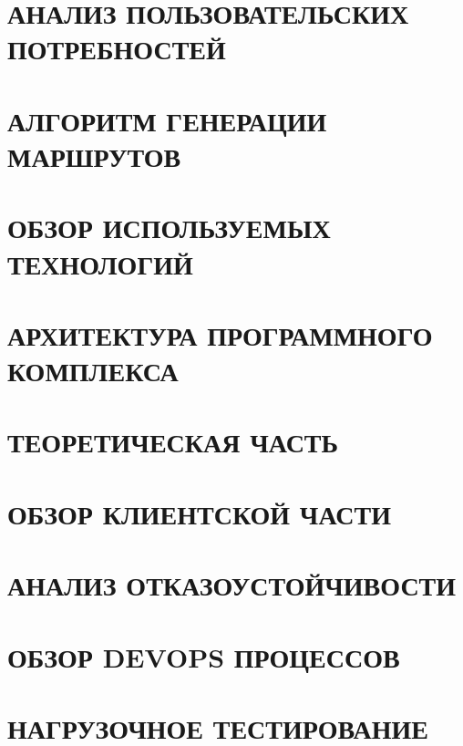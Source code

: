 \documentclass[a4paper,14pt,russian]{extreport}
\begin{document}
    
    
    \tableofcontents
    
    \newpage
    
    
    \chapter{АНАЛИЗ ПОЛЬЗОВАТЕЛЬСКИХ ПОТРЕБНОСТЕЙ}
    
    
    \chapter{АЛГОРИТМ ГЕНЕРАЦИИ МАРШРУТОВ}
    
    
    \chapter{ОБЗОР ИСПОЛЬЗУЕМЫХ ТЕХНОЛОГИЙ}
    
    
    \chapter{АРХИТЕКТУРА ПРОГРАММНОГО КОМПЛЕКСА}
    
    
    \chapter{ТЕОРЕТИЧЕСКАЯ ЧАСТЬ}
    
    
    \chapter{ОБЗОР КЛИЕНТСКОЙ ЧАСТИ}
    
    
    \chapter{АНАЛИЗ ОТКАЗОУСТОЙЧИВОСТИ}
    
    
    \chapter{ОБЗОР DEVOPS ПРОЦЕССОВ}
    
    
    \chapter{НАГРУЗОЧНОЕ ТЕСТИРОВАНИЕ}
    
    
    \newpage
    
    
    \newpage
    
    
    \newpage
    \listoffigures
    \newpage
    \listoftables
    \newpage
    \listoflistings
\end{document}
